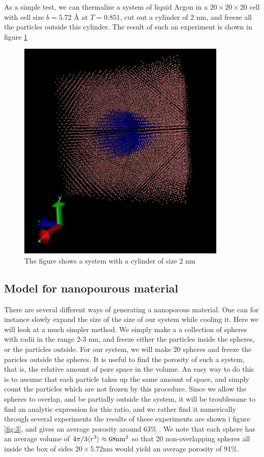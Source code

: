 \documentclass[12pt]{article}
\begin{document}
 As a simple test, we can thermalize a system of liquid Argon in a $20\times20\times 20$ cell with cell size $b = 5.72$ Å at $T = 0.851$, cut out a cylinder of 2 nm, and freeze all the particles outside this cylinder. The result of such an experiment is shown in figure \ref{fig:2}
 
  \begin{figure}
  \centering
  \includegraphics[width=10cm]{cylinder.png}
\caption{\label{fig:2} The figure shows a system with a cylinder of size 2 nm}
 \end{figure} 
 
 \subsection{Model for nanopourous material}
 There are several different ways of generating a nanoporous material. One can for instance slowly expand the size of the size of our system while cooling it. Here we will look at a much simpler method. We simply make a a collection of spheres with radii in the range 2-3 nm, and freeze either the particles inside the spheres, or the particles outside. For our system, we will make 20 spheres and freeze the paricles outside the spheres. It is useful to find the porosity of such a system, that is, the relative amount of pore space in the volume. An easy way to do this is to assume that each particle takes up the same amount of space, and simply count the particles which are not frozen by this procedure. Since we allow the spheres to overlap, and be partially outside the system, it will be troublesome to find an analytic expression for this ratio, and we rather find it numerically through several experiments the results of these experiments are shown i figure \ref{fig:3}, and gives an average porosity around 63\%
. We note that each sphere has an average volume of $4\pi/3 \langle r^3 \rangle \approx 68 \rm{nm}^2$ so that 20 non-overlapping spheres all inside the box of sides $20 \times 5.72$nm would yield an average porosity of 91\%.
 
\end{document}

